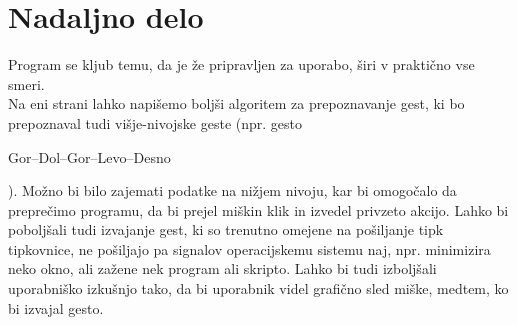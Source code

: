 \documentclass[10pt,a4paper,oneside]{book}
\newcommand\inline[1]{%
\begin{Sbox}{#1}\end{Sbox}%
\colorbox{lightgray}{\TheSbox}%
}
\begin{document}
\chapter{Nadaljno delo}
Program se kljub temu, da je že pripravljen za uporabo, širi v praktično vse smeri.\\
Na eni strani lahko napišemo boljši algoritem za prepoznavanje gest, ki bo prepoznaval tudi višje-nivojske geste (npr. gesto \inline{Gor--Dol--Gor--Levo--Desno}). Možno bi bilo zajemati podatke na nižjem nivoju, kar bi omogočalo da preprečimo programu, da bi prejel miškin klik in izvedel privzeto akcijo. Lahko bi poboljšali tudi izvajanje gest, ki so trenutno omejene na pošiljanje tipk tipkovnice, ne pošiljajo pa signalov operacijskemu sistemu naj, npr. minimizira neko okno, ali zažene nek program ali skripto. Lahko bi tudi izboljšali uporabniško izkušnjo tako, da bi uporabnik videl grafično sled miške, medtem, ko bi izvajal gesto.
\end{document}
